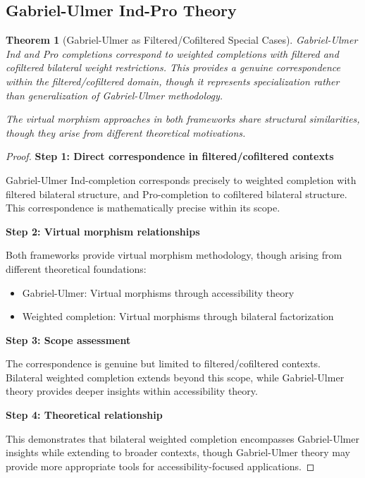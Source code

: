 \documentclass[11pt]{article}
\theoremstyle{plain}
\newtheorem{theorem}{Theorem}[section]
\theoremstyle{definition}
\theoremstyle{remark}
\begin{document}
\subsection{Gabriel-Ulmer Ind-Pro Theory}

\begin{theorem}[Gabriel-Ulmer as Filtered/Cofiltered Special Cases]\label{thm:gabriel-ulmer-correspondence}
Gabriel-Ulmer Ind and Pro completions \cite{gabriel1971lokal} correspond to weighted completions with filtered and cofiltered bilateral weight restrictions. This provides a genuine correspondence within the filtered/cofiltered domain, though it represents specialization rather than generalization of Gabriel-Ulmer methodology.

The virtual morphism approaches in both frameworks share structural similarities, though they arise from different theoretical motivations.
\end{theorem}

\begin{proof}
\textbf{Step 1: Direct correspondence in filtered/cofiltered contexts}

Gabriel-Ulmer Ind-completion corresponds precisely to weighted completion with filtered bilateral structure, and Pro-completion to cofiltered bilateral structure. This correspondence is mathematically precise within its scope.

\textbf{Step 2: Virtual morphism relationships}

Both frameworks provide virtual morphism methodology, though arising from different theoretical foundations:
\begin{itemize}
\item Gabriel-Ulmer: Virtual morphisms through accessibility theory
\item Weighted completion: Virtual morphisms through bilateral factorization
\end{itemize}

\textbf{Step 3: Scope assessment}

The correspondence is genuine but limited to filtered/cofiltered contexts. Bilateral weighted completion extends beyond this scope, while Gabriel-Ulmer theory provides deeper insights within accessibility theory.

\textbf{Step 4: Theoretical relationship}

This demonstrates that bilateral weighted completion encompasses Gabriel-Ulmer insights while extending to broader contexts, though Gabriel-Ulmer theory may provide more appropriate tools for accessibility-focused applications.
\end{proof}
\end{document}
